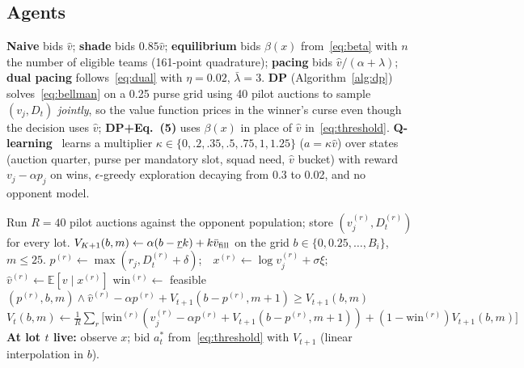 \documentclass{article}
\newcommand{\E}{\mathbb{E}}
\newcommand{\1}{\mathbb{1}}
\newcommand{\crore}{\text{\,cr}}
\newcommand{\rupee}{\text{Rs.\,}}
\begin{document}
\subsection{Agents}
\textbf{Naive} bids $\hat v$; \textbf{shade} bids $0.85\hat v$; \textbf{equilibrium} bids $\beta(x)$ from~\eqref{eq:beta} with $n$ the number of eligible teams (161-point quadrature); \textbf{pacing} bids $\hat v/(\alpha+\lambda)$; \textbf{dual pacing} follows~\eqref{eq:dual} with $\eta=0.02$, $\bar\lambda=3$. \textbf{DP} (Algorithm~\ref{alg:dp}) solves~\eqref{eq:bellman} on a \rupee0.25\crore{} purse grid using 40 pilot auctions to sample $(v_j,D_t)$ \emph{jointly}, so the value function prices in the winner's curse even though the decision uses $\hat v$; \textbf{DP+Eq.~(5)} uses $\beta(x)$ in place of $\hat v$ in~\eqref{eq:threshold}. \textbf{Q-learning}~\citep{watkins1992} learns a multiplier $\kappa\in\{0,.2,.35,.5,.75,1,1.25\}$ ($a=\kappa\hat v$) over states (auction quarter, purse per mandatory slot, squad need, $\hat v$ bucket) with reward $v_j-\alpha p_j$ on wins, $\epsilon$-greedy exploration decaying from 0.3 to 0.02, and no opponent model.

\begin{algorithm}[t]
\caption{Budget-aware DP bidder (full-information opponent model)}\label{alg:dp}
\small
\begin{algorithmic}[1]
\State Run $R=40$ pilot auctions against the opponent population; store $(v^{(r)}_j,D^{(r)}_t)$ for every lot.
\State $V_{K+1}(b,m)\gets\alpha(b-\underline r k)+k\bar v_{\rm fill}$ on the grid $b\in\{0,0.25,\dots,B_i\}$, $m\le25$.
 
  \State $p^{(r)}\gets\max(r_j,D_t^{(r)}+\delta)$;\ \ $x^{(r)}\gets\log v^{(r)}_j+\sigma\xi$;\ \ $\hat v^{(r)}\gets\E[v\mid x^{(r)}]$
  \State win$^{(r)}\gets$ feasible$(p^{(r)},b,m)\wedge\hat v^{(r)}-\alpha p^{(r)}+V_{t+1}(b-p^{(r)},m{+}1)\ge V_{t+1}(b,m)$
  \State $V_t(b,m)\gets\frac1R\sum_r\big[\text{win}^{(r)}(v^{(r)}_j-\alpha p^{(r)}+V_{t+1}(b-p^{(r)},m{+}1))+(1-\text{win}^{(r)})V_{t+1}(b,m)\big]$
\EndFor
\State \textbf{At lot $t$ live:} observe $x$; bid $a^\ast_t$ from~\eqref{eq:threshold} with $V_{t+1}$ (linear interpolation in $b$).
\end{algorithmic}
\end{algorithm}
\end{document}
